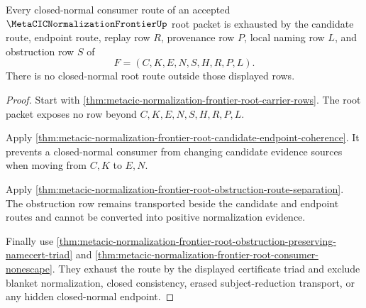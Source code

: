 \begin{theorem}
\label{thm:metacic-normalization-frontier-root-closed-normal-route-totality}
Every closed-normal consumer route of an accepted $\MetaCICNormalizationFrontierUp$ root packet is exhausted by the candidate route, endpoint route, replay row $R$, provenance row $P$, local naming row $L$, and obstruction row $S$ of
$$
F=(C,K,E,N,S,H,R,P,L).
$$
There is no closed-normal root route outside those displayed rows.
\end{theorem}
\begin{proof}
Start with \autoref{thm:metacic-normalization-frontier-root-carrier-rows}. The root packet exposes no row beyond $C,K,E,N,S,H,R,P,L$.

Apply \autoref{thm:metacic-normalization-frontier-root-candidate-endpoint-coherence}. It prevents a closed-normal consumer from changing candidate evidence sources when moving from $C,K$ to $E,N$.

Apply \autoref{thm:metacic-normalization-frontier-root-obstruction-route-separation}. The obstruction row remains transported beside the candidate and endpoint routes and cannot be converted into positive normalization evidence.

Finally use \autoref{thm:metacic-normalization-frontier-root-obstruction-preserving-namecert-triad} and \autoref{thm:metacic-normalization-frontier-root-consumer-nonescape}. They exhaust the route by the displayed certificate triad and exclude blanket normalization, closed consistency, erased subject-reduction transport, or any hidden closed-normal endpoint.
\end{proof}
